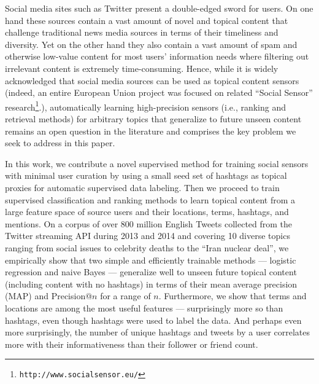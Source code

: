 
\label{sec:introduction}

Social media sites such as Twitter present a double-edged sword for
users.  On one hand these sources contain a vast amount of novel and
topical content that challenge traditional news media sources in terms
of their timeliness and diversity.  Yet on the other hand they also
contain a vast amount of spam and otherwise low-value content for most
users' information needs where filtering out irrelevant content is
extremely time-consuming.  Hence, while it is widely acknowledged that
social media sources can be used as topical content sensors (indeed,
an entire European Union project was focused on related ``Social Sensor''
research\footnote{\texttt{http://www.socialsensor.eu/}}.),
automatically learning high-precision sensors (i.e., ranking and
retrieval methods) for arbitrary topics that generalize to future
unseen content remains an open question in the literature and
comprises the key problem we seek to address in this paper.

In this work, we contribute a novel supervised method for training
social sensors with minimal user curation by using a small seed set of
hashtags as topical proxies for automatic supervised data labeling.
Then we proceed to train supervised classification and ranking methods
to learn topical content from a large feature space of source users
and their locations, terms, hashtags, and mentions.  On a corpus of
over 800 million English Tweets collected from the Twitter streaming
API during 2013 and 2014 and covering 10 diverse topics ranging from
social issues to celebrity deaths to the ``Iran nuclear deal'', we
empirically show that two simple and efficiently trainable methods ---
logistic regression and naive Bayes --- generalize well to unseen
future topical content (including content with no hashtags) in terms
of their mean average precision (MAP) and Precision@$n$ for a range of
$n$.  Furthermore, we show that terms and locations are among the most
useful features --- surprisingly more so than hashtags, even though
hashtags were used to label the data.  And perhaps even more
surprisingly, the number of unique hashtags and tweets by a user
correlates more with their informativeness than their follower or
friend count.


